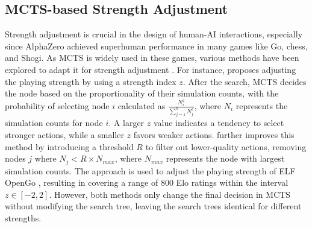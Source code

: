 \subsection{MCTS-based Strength Adjustment}
\label{subsec:bg_mcts_sa}
Strength adjustment \citep{hunicke_ai_2004, paulsen_moderately_2010, silva_dynamic_2015, moon_dynamic_2020} is crucial in the design of human-AI interactions, especially since AlphaZero achieved superhuman performance in many games like Go, chess, and Shogi.
As MCTS is widely used in these games, various methods have been explored to adapt it for strength adjustment \citep{sephton_experimental_2015, wu_strength_2019, demediuk_monte_2017, fan_position_2019, moon_diversifying_2022}.
For instance, \citet{sephton_experimental_2015} proposes adjusting the playing strength by using a strength index $z$.
After the search, MCTS decides the node based on the proportionality of their simulation counts, with the probability of selecting node $i$ calculated as $\frac{N_i^z}{\sum_{j=1}^{n}N_j^z}$, where $N_i$ represents the simulation counts for node $i$.
A larger $z$ value indicates a tendency to select stronger actions, while a smaller $z$ favors weaker actions.
\citet{wu_strength_2019} further improves this method by introducing a threshold $R$ to filter out lower-quality actions, removing nodes $j$ where $N_j<R\times N_{max}$, where $N_{max}$ represents the node with largest simulation counts.
The approach is used to adjust the playing strength of ELF OpenGo \citep{tian_elf_2019}, resulting in covering a range of 800 Elo ratings within the interval $z\in[-2,2]$.
However, both methods only change the final decision in MCTS without modifying the search tree, leaving the search trees identical for different strengths.


